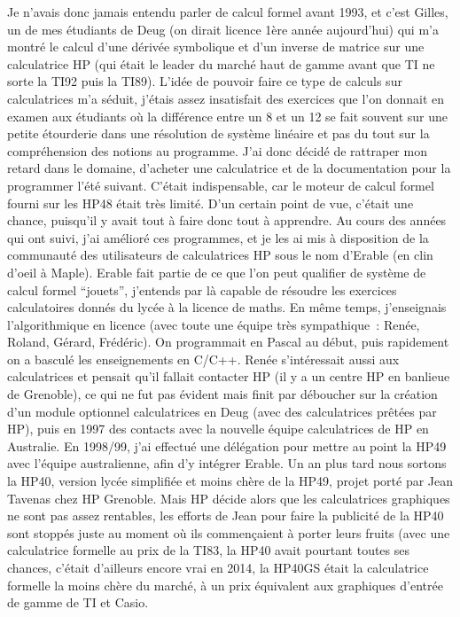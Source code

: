 \documentclass[a4paper,11pt]{book}
\begin{document}
\begin{giacjshere}
Je n'avais donc jamais entendu parler de calcul formel
avant 1993, et c'est Gilles, un de mes \'etudiants de Deug (on
dirait licence 1\`ere ann\'ee aujourd'hui) qui m'a montr\'e
le calcul d'une d\'eriv\'ee symbolique et d'un inverse
de matrice sur une calculatrice HP (qui \'etait le leader du march\'e
haut de gamme avant que TI ne sorte la TI92 puis la TI89).
L'id\'ee de pouvoir faire ce type de calculs sur calculatrices
m'a s\'eduit, j'\'etais assez insatisfait des exercices
que l'on donnait en examen aux \'etudiants o\`u la
diff\'erence entre un 8 et un 12 se fait souvent sur une petite
\'etourderie dans une r\'esolution de syst\`eme lin\'eaire
et pas du tout sur la compr\'ehension des notions au programme.
J'ai donc d\'ecid\'e de rattraper mon retard dans le domaine,
d'acheter une calculatrice et de la documentation pour la
programmer l'\'et\'e suivant. C'\'etait indispensable, car le moteur
de calcul formel fourni sur les HP48 \'etait tr\`es limit\'e. D'un
certain point de vue, c'\'etait une chance, puisqu'il y avait
tout \`a faire donc tout \`a apprendre.
Au cours des ann\'ees qui ont suivi, j'ai am\'elior\'e ces programmes,
et je les ai mis \`a disposition de la communaut\'e des utilisateurs
de calculatrices HP sous le nom d'Erable (en clin d'oeil \`a Maple).
Erable fait partie de ce que l'on peut qualifier de syst\`eme de
calcul formel ``jouets'', j'entends par l\`a capable de r\'esoudre
les exercices calculatoires donn\'es du lyc\'ee \`a la licence de maths.
En m\^eme temps, j'enseignais
l'algorithmique en licence (avec toute
une \'equipe tr\`es sympathique~: Ren\'ee, Roland,
G\'erard, Fr\'ed\'eric). On programmait en Pascal au d\'ebut, puis
rapidement on a bascul\'e les enseignements en C/C++.
Ren\'ee s'int\'eressait
aussi aux calculatrices et pensait qu'il fallait contacter HP (il
y a un centre HP en banlieue de Grenoble),
ce qui ne fut pas \'evident mais finit par d\'eboucher sur
la cr\'eation d'un module optionnel calculatrices en Deug
(avec des calculatrices pr\^et\'ees par HP),
puis en 1997 des contacts avec la nouvelle \'equipe calculatrices
de HP en Australie. En 1998/99, j'ai effectu\'e une d\'el\'egation
pour mettre au point la HP49 avec l'\'equipe australienne,
afin d'y intégrer Erable.
Un an plus tard nous sortons
la HP40, version lyc\'ee simplifi\'ee et moins ch\`ere de la HP49,
projet port\'e par Jean Tavenas chez HP Grenoble.
Mais HP d\'ecide alors que les calculatrices graphiques
ne sont pas assez rentables, les efforts de Jean pour
faire la publicit\'e de la HP40 sont stopp\'es juste au
moment o\`u ils commen\c{c}aient \`a porter leurs fruits
(avec une calculatrice formelle au prix de la TI83,
la HP40 avait pourtant toutes ses chances, c'\'etait
d'ailleurs encore vrai en 2014,
la HP40GS \'etait la calculatrice formelle
la moins ch\`ere du march\'e, 
\`a un prix \'equivalent aux graphiques d'entr\'ee de gamme de TI et Casio.


\end{giacjshere}
\end{document}
